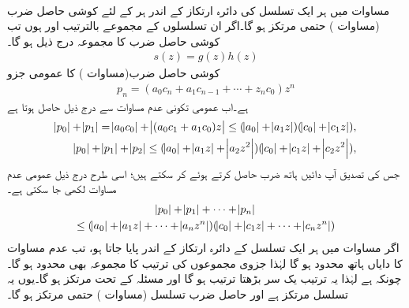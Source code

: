 \quad {}\\
مساوات  میں ہر ایک تسلسل کی دائرہ ارتکاز کے اندر ہر  کے لئے کوشی حاصل ضرب  (مساوات ) حتمی مرتکز ہو گا۔اگر ان تسلسلوں کے مجموعے بالترتیب  اور  ہوں تب کوشی حاصل ضرب کا مجموعہ درج ذیل ہو گا۔
\begin{align}\label{مساوات_ٹیلر_کوشی_حاصل_ضرب_پ}
s(z)=g(z)h(z)
\end{align}
\quad
کوشی حاصل ضرب(مساوات ) کا عمومی جزو 
\begin{align*}
p_n=(a_0c_n+a_1c_{n-1}+\cdots+z_nc_0)z^n
\end{align*}
ہے۔اب عمومی تکونی عدم مساوات  سے درج ذیل حاصل ہوتا ہے
\begin{align*}
\abs{p_0}+\abs{p_1}=\abs{a_0c_0}+\abs{(a_0c_1+a_1c_0)z}\le (\abs{a_0}+\abs{a_1z})(\abs{c_0}+\abs{c_1z}),\\
\abs{p_0}+\abs{p_1}+\abs{p_2}\le (\abs{a_0}+\abs{a_1z}+\abs{a_2z^2})(\abs{c_0}+\abs{c_1z}+\abs{c_2z^2}),
\end{align*}
جس کی تصدیق آپ دائیں ہاتھ ضرب حاصل کرتے ہوئے کر سکتے ہیں؛ اسی طرح درج ذیل عمومی عدم مساوات لکھی جا سکتی ہے۔
\begin{multline}\label{مساوات_ٹیلر_کوشی_حاصل_ضرب_ت}
\abs{p_0}+\abs{p_1}+\cdots+\abs{p_n}\\
\le (\abs{a_0}+\abs{a_1z}+\cdots+\abs{a_nz^n})(\abs{c_0}+\abs{c_1z}+\cdots+\abs{c_nz^n})
\end{multline} 
اگر   مساوات  میں ہر ایک تسلسل کے دائرہ ارتکاز کے اندر پایا جاتا ہو، تب  عدم مساوات  کا دایاں ہاتھ محدود ہو گا لہٰذا جزوی مجموعوں کی ترتیب کا مجموعہ   بھی محدود ہو گا۔چونکہ  ہے لہٰذا یہ ترتیب یک سر بڑھتا ترتیب ہو گا اور  مسئلہ   کے تحت مرتکز ہو گا۔یوں یہ تسلسل مرتکز ہے اور حاصل ضرب تسلسل (مساوات ) حتمی مرتکز ہو گا۔ 

